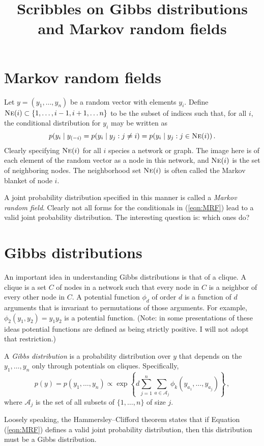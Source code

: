 \documentclass[12pt]{article}
\title{Scribbles on Gibbs distributions and Markov random fields}
\newcommand{\Ne}{\mbox{\textsc{Ne}}}
\begin{document}
\maketitle

\section{Markov random fields}

Let $y = (y_1, \ldots, y_n)$ be a random vector with elements $y_i$.  Define $\Ne(i) \subset \{1, \ldots, i-1, i+1, \ldots n\}$ to be the subset of indices such that, for all $i$, the conditional distribution for $y_i$ may be written as
\begin{equation}
\label{eqn:MRF}
p(y_i \mid y_{(-i)} = p(y_i \mid y_j: j \neq i) = p(y_i \mid y_j: j \in \Ne(i)) \, .
\end{equation}
Clearly specifying $\Ne(i)$ for all $i$ species a network or graph.  The image here is of each element of the random vector as a node in this network, and $\Ne(i)$ is the set of neighboring nodes.  The neighborhood set $\Ne(i)$ is often called the Markov blanket of node $i$.

A joint probability distribution specified in this manner is called a \textit{Markov random field}.  Clearly not all forms for the conditionals in (\ref{eqn:MRF}) lead to a valid joint probability distribution.  The interesting question is: which ones do?

\section{Gibbs distributions}

An important idea in understanding Gibbs distributions is that of a clique.  A clique is a set $C$ of nodes in a network such that every node in $C$ is a neighbor of every other node in $C$.  A potential function $\phi_d$ of order $d$ is a function of $d$ arguments that is invariant to permutations of those arguments.  For example, $\phi_2(y_1, y_2) = y_1 y_2$ is a potential function. (Note: in some presentations of these ideas potential functions are defined as being strictly positive.  I will not adopt that restriction.)

A \textit{Gibbs distribution} is a probability distribution over $y$ that depends on the $y_1, \ldots, y_n$ only through potentials on cliques.  Specifically,
$$
p(y) = p(y_1, \ldots, y_n) \propto \exp \left\{ d \sum_{j=1}^n \sum_{a \in \mathcal{A}_j} \phi_{k}(y_{a_1}, \ldots, y_{a_j}) \right\} \, ,
$$
where $\mathcal{A}_j$ is the set of all subsets of $\{1, \ldots, n\}$ of size $j$.

Loosely speaking, the Hammersley--Clifford theorem states that if Equation (\ref{eqn:MRF}) defines a valid joint probability distribution, then this distribution must be a Gibbs distribution.
%
%
%
\end{document}
